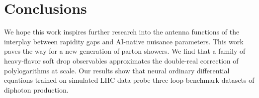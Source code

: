 \section{Conclusions}\label{sec:conclusions}

We hope this work inspires further research into the antenna functions
of the interplay between rapidity gaps and AI-native nuisance
parameters. This work paves the way for a new generation of parton
showers. We find that a family of heavy-flavor soft drop observables
approximates the double-real correction of polylogarithms at scale. Our
results show that neural ordinary differential equations trained on
simulated LHC data probe three-loop benchmark datasets of diphoton
production.

